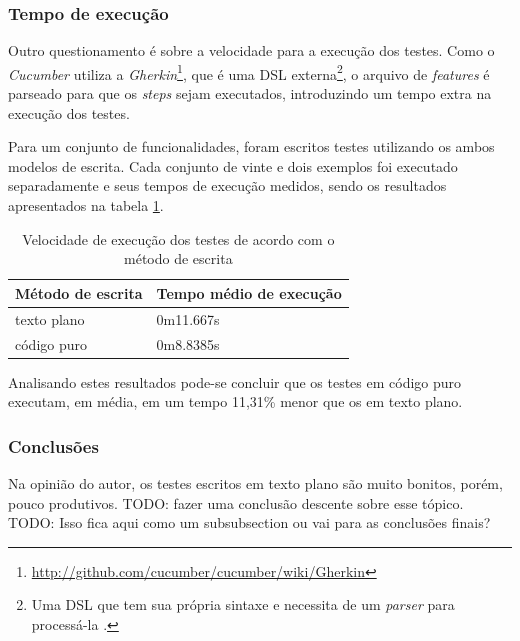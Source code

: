 
\subsubsection{Tempo de execução} %
\label{subsub:tempo_de_execucao}

Outro questionamento é sobre a velocidade para a execução dos testes. Como o \textit{Cucumber} utiliza a \textit{Gherkin}\footnote{\url{http://github.com/cucumber/cucumber/wiki/Gherkin}}, que é uma DSL externa\footnote{Uma DSL que tem sua própria sintaxe e necessita de um \textit{parser} para processá-la \cite{DSLFowler}.}, o arquivo de \textit{features} é parseado para que os \textit{steps} sejam executados, introduzindo um tempo extra na execução dos testes.

Para um conjunto de funcionalidades, foram escritos testes utilizando os ambos modelos de escrita. Cada conjunto de vinte e dois exemplos foi executado separadamente e seus tempos de execução medidos, sendo os resultados apresentados na tabela \ref{table:tempo_de_execucao}.

\begin{table}[ht]
\caption{Velocidade de execução dos testes de acordo com o método de escrita}
\label{table:tempo_de_execucao}
\centering
\begin{tabular}{p{4.5cm} p{6.5cm}}
\toprule
\textbf{Método de escrita} & \textbf{Tempo médio de execução} \\
\midrule[1pt]
texto plano & 0m11.667s \\ \midrule
código puro & 0m8.8385s \\
\bottomrule
\end{tabular}
\end{table}

Analisando estes resultados pode-se concluir que os testes em código puro executam, em média, em um tempo 11,31\% menor que os em texto plano.


\subsubsection{Conclusões} %
\label{subsub:conclusoes_bdd}

Na opinião do autor, os testes escritos em texto plano são muito bonitos, porém, pouco produtivos. TODO: fazer uma conclusão descente sobre esse tópico. TODO: Isso fica aqui como um subsubsection ou vai para as conclusões finais?

